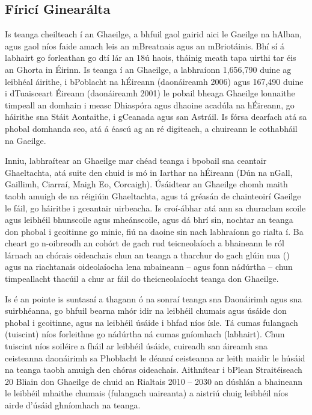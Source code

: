\begin{multicols}{2}

\subsection{Fíricí Ginearálta}

Is teanga cheilteach í an Ghaeilge, a bhfuil gaol gairid aici le Gaeilge na hAlban, agus gaol níos faide amach leis an mBreatnais agus an mBriotáinis. Bhí sí á labhairt go forleathan go dtí lár an 18ú haois, tháinig meath tapa uirthi tar éis an Ghorta in Éirinn. Is teanga í an Ghaeilge, a labhraíonn 1,656,790 duine ag leibhéal áirithe, i bPoblacht na hÉireann (daonáireamh 2006) agus 167,490 duine i dTuaisceart Éireann (daonáireamh 2001) le pobail bheaga Ghaeilge lonnaithe timpeall an domhain i measc Dhiaspóra agus dhaoine acadúla na hÉireann, go háirithe sna Stáit Aontaithe, i gCeanada agus san Astráil. Is fórsa dearfach atá sa phobal domhanda seo, atá á éascú ag an ré digiteach, a chuireann le cothabháil na Gaeilge.

Inniu, labhraítear an Ghaeilge mar chéad teanga i bpobail sna ceantair Ghaeltachta, atá suite den chuid is mó in Iarthar na hÉireann (Dún na nGall, Gaillimh, Ciarraí, Maigh Eo, Corcaigh). Úsáidtear an Ghaeilge chomh maith taobh amuigh de na réigiúin Ghaeltachta, agus tá gréasán de chainteoirí Gaeilge le fáil, go háirithe i gceantair uirbeacha.   Is croí-ábhar atá ann sa churaclam scoile agus leibhéil bhunscoile agus mheánscoile, agus dá bhrí sin, nochtar an teanga don phobal i gcoitinne go minic, fiú na daoine sin nach labhraíonn go rialta í. Ba cheart go n-oibreodh an cohórt de gach rud teicneolaíoch a bhaineann le ról lárnach an chórais oideachais chun an teanga a tharchur do gach glúin nua (\cite{oriagain97}) agus na riachtanais oideolaíocha lena mbaineann – agus fonn nádúrtha – chun timpeallacht thacúil a chur ar fáil do theicneolaíocht teanga don Ghaeilge.

Is é an pointe is suntasaí a thagann ó na sonraí teanga sna Daonáirimh agus sna suirbhéanna, go bhfuil bearna mhór idir na leibhéil chumais agus úsáide don phobal i gcoitinne, agus na leibhéil úsáide i bhfad níos ísle. Tá cumas fulangach (tuiscint) níos forleithne go nádúrtha ná cumas gníomhach (labhairt). Chun tuiscint níos soiléire a fháil ar leibhéil úsáide, cuireadh san áireamh sna ceisteanna daonáirimh sa Phoblacht le déanaí ceisteanna ar leith maidir le húsáid na teanga taobh amuigh den chóras oideachais. Aithnítear i bPlean Straitéiseach 20 Bliain don Ghaeilge de chuid an Rialtais 2010 -- 2030 an dúshlán a bhaineann le leibhéil mhaithe chumais (fulangach uaireanta) a aistriú chuig leibhéil níos airde d’úsáid ghníomhach na teanga.


\end{multicols}
